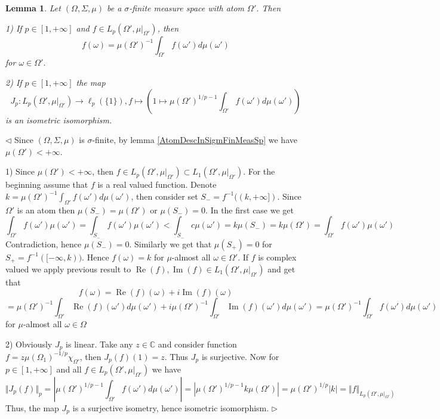 \documentclass[12pt]{article}
\newtheorem{lemma}[theorem]{Lemma}
\newenvironment{proof}{\par $\triangleleft$}{$\triangleright$}
\begin{document}
\begin{lemma}\label{FuncDescOnAtom} Let $(\Omega,\Sigma,\mu)$ be a $\sigma$-finite measure space with atom $\Omega'$. Then

1) If $p\in[1,+\infty]$ and $f\in L_p(\Omega',\mu|_{\Omega'})$, then
$$
f(\omega)=\mu(\Omega')^{-1}\int_{\Omega'} f(\omega')d\mu(\omega')
$$
for $\omega\in\Omega'$.

2) If $p\in[1,+\infty]$ the map
$$
J_p:L_p(\Omega',\mu|_{\Omega'})\to \ell_p(\{1\}),f\mapsto\left(1\mapsto \mu(\Omega')^{1/p-1}\int_{\Omega'} f(\omega')d\mu(\omega')\right)
$$
is an isometric isomorphism.

\end{lemma}
\begin{proof}
Since $(\Omega,\Sigma,\mu)$ is $\sigma$-finite, by lemma \ref{AtomDescInSigmFinMeasSp} we have $\mu(\Omega')<+\infty$.

1) Since $\mu(\Omega')<+\infty$, then $f\in L_p(\Omega',\mu|_{\Omega'})\subset L_1(\Omega',\mu|_{\Omega'})$. For the beginning assume that $f$ is a real valued function. Denote $k=\mu(\Omega')^{-1}\int_{\Omega'} f(\omega')d\mu(\omega')$, then consider set $S_-=f^{-1}((k,+\infty])$. Since $\Omega'$ is an atom then $\mu(S_-)=\mu(\Omega')$ or $\mu(S_-)=0$. In the first case we get
$$
\int_{\Omega'} f(\omega')\mu(\omega')
=\int_{S_-} f(\omega')\mu(\omega')
<\int_{S_-} c\mu(\omega')
=k\mu(S_-)
=k\mu(\Omega')
=\int_{\Omega'} f(\omega')\mu(\omega')
$$
Contradiction, hence $\mu(S_-)=0$. Similarly we get that $\mu(S_+)=0$ for $S_+=f^{-1}([-\infty,k))$. Hence $f(\omega)=k$ for $\mu$-almost all $\omega\in\Omega'$. If $f$ is complex valued we apply previous result to $\operatorname{Re}(f),\operatorname{Im}(f)\in L_1(\Omega',\mu|_{\Omega'})$ and get that
$$
f(\omega)
=\operatorname{Re}(f)(\omega)+i\operatorname{Im}(f)(\omega)
$$
$$
=\mu(\Omega')^{-1}\int_{\Omega'} \operatorname{Re}(f)(\omega')d\mu(\omega')+i\mu(\Omega')^{-1}\int_{\Omega'} \operatorname{Im}(f)(\omega')d\mu(\omega')
=\mu(\Omega')^{-1}\int_{\Omega'} f(\omega')d\mu(\omega')
$$
for $\mu$-almost all $\omega\in\Omega$

2) Obviously $J_p$ is linear. Take any $z\in\mathbb{C}$ and consider function $f=z\mu(\Omega_1)^{-1/p}\chi_{\Omega'}$, then $J_p(f)(1)=z$. Thus $J_p$ is surjective. Now for $p\in[1,+\infty]$ and all $f\in L_p(\Omega',\mu|_{\Omega'})$ we have
$$
\Vert J_p(f)\Vert_p
=\left|\mu(\Omega')^{1/p-1}\int_{\Omega'}f(\omega')d\mu(\omega')\right|
=\left|\mu(\Omega')^{1/p-1}k\mu(\Omega')\right|
=\mu(\Omega')^{1/p}|k|
=\Vert f\Vert_{L_p(\Omega',\mu|_{\Omega'})}
$$
Thus, the map $J_p$ is a surjective isometry, hence isometric isomorphism.
\end{proof}
\end{document}
